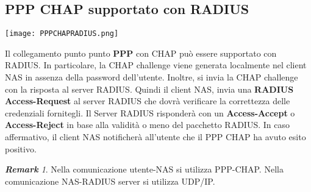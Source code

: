 \documentclass{article}
\theoremstyle{remark}
\newtheorem*{remark}{\textbf{Remark}}
\begin{document}
\subsection{PPP CHAP supportato con RADIUS}
\begin{center}
    \texttt{[image: PPPCHAPRADIUS.png]}
\end{center}
Il collegamento punto punto \textbf{PPP} con CHAP può essere supportato con RADIUS. In particolare, la CHAP challenge viene generata localmente nel client NAS in assenza della password dell'utente. Inoltre, si invia la CHAP challenge con la risposta al server RADIUS. Quindi il client NAS, invia una \textbf{RADIUS Access-Request} al server RADIUS che dovrà verificare la correttezza delle credenziali fornitegli. Il Server RADIUS risponderà con un \textbf{Access-Accept} o \textbf{Access-Reject} in base alla validità o meno del pacchetto RADIUS. In caso affermativo, il client NAS notificherà all'utente che il PPP CHAP ha avuto esito positivo.
\begin{remark}
Nella comunicazione utente-NAS si utilizza PPP-CHAP.\newline
Nella comunicazione NAS-RADIUS server si utilizza UDP/IP.
\end{remark}
\end{document}
